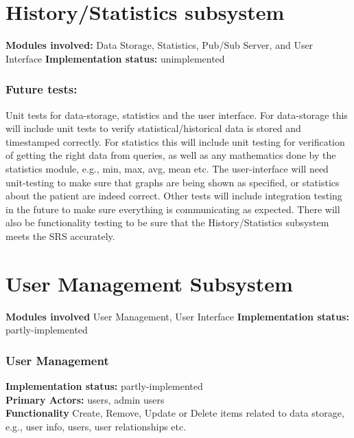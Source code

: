 \documentclass[12pt]{article}
\begin{document}
{	\section{History/Statistics subsystem}
	\textbf{Modules involved:} Data Storage, Statistics, Pub/Sub Server, and User Interface
	\textbf{Implementation status:} unimplemented
	\subsubsection{Future tests:} Unit tests for data-storage, statistics and the user interface. For data-storage this will include unit tests to verify statistical/historical data is stored and timestamped correctly. For statistics this will include unit testing for verification of getting the right data from queries, as well as any mathematics done by the statistics module, e.g., min, max, avg, mean etc. The user-interface will need unit-testing to make sure that graphs are being shown as specified, or statistics about the patient are indeed correct. Other tests will include integration testing in the future to make sure everything is communicating as expected. There will also be functionality testing to be sure that the History/Statistics subsystem meets the SRS accurately. 

	\section{User Management Subsystem }
	\textbf{Modules involved} User Management, User Interface
	\textbf{Implementation status:} partly-implemented


	\subsubsection{User Management}

	\textbf{Implementation status:} partly-implemented \\
	\textbf{Primary Actors:} users, admin users \\
	\textbf{Functionality} Create, Remove, Update or Delete items related to data storage, e.g., user info, users, user relationships etc.  \\
}
\end{document}
